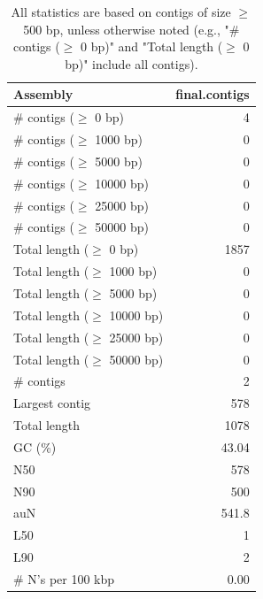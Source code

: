 \documentclass[12pt,a4paper]{article}
\begin{document}
\begin{table}[ht]
\begin{center}
\caption{All statistics are based on contigs of size $\geq$ 500 bp, unless otherwise noted (e.g., "\# contigs ($\geq$ 0 bp)" and "Total length ($\geq$ 0 bp)" include all contigs).}
\begin{tabular}{|l*{1}{|r}|}
\hline
Assembly & final.contigs \\ \hline
\# contigs ($\geq$ 0 bp) & 4 \\ \hline
\# contigs ($\geq$ 1000 bp) & 0 \\ \hline
\# contigs ($\geq$ 5000 bp) & 0 \\ \hline
\# contigs ($\geq$ 10000 bp) & 0 \\ \hline
\# contigs ($\geq$ 25000 bp) & 0 \\ \hline
\# contigs ($\geq$ 50000 bp) & 0 \\ \hline
Total length ($\geq$ 0 bp) & 1857 \\ \hline
Total length ($\geq$ 1000 bp) & 0 \\ \hline
Total length ($\geq$ 5000 bp) & 0 \\ \hline
Total length ($\geq$ 10000 bp) & 0 \\ \hline
Total length ($\geq$ 25000 bp) & 0 \\ \hline
Total length ($\geq$ 50000 bp) & 0 \\ \hline
\# contigs & 2 \\ \hline
Largest contig & 578 \\ \hline
Total length & 1078 \\ \hline
GC (\%) & 43.04 \\ \hline
N50 & 578 \\ \hline
N90 & 500 \\ \hline
auN & 541.8 \\ \hline
L50 & 1 \\ \hline
L90 & 2 \\ \hline
\# N's per 100 kbp & 0.00 \\ \hline
\end{tabular}
\end{center}
\end{table}
\end{document}
